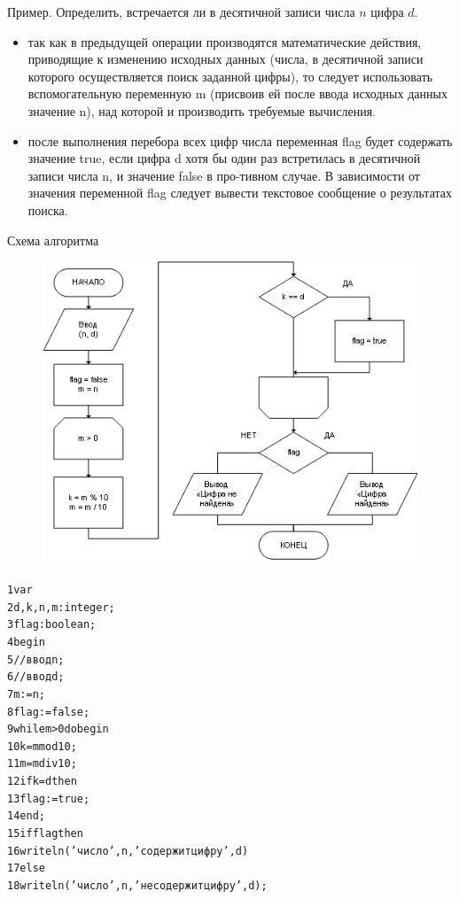 \documentclass{beamer}
\begin{document}
\begin{frame}{Пример.}
Определить, встречается ли в десятичной записи числа $n$ цифра $d$.
\begin{itemize}
\item так как в предыдущей операции производятся математические действия, приводящие к изменению исходных данных (числа, в десятичной записи которого осуществляется поиск заданной цифры), то следует использовать вспомогательную переменную m (присвоив ей после ввода исходных данных значение n), над которой и производить требуемые вычисления.
\item после выполнения перебора всех цифр числа переменная flag будет содержать значение true, если цифра d хотя бы один раз встретилась в десятичной записи числа n, и значение false в про-тивном случае. В зависимости от значения переменной flag следует вывести текстовое сообщение о результатах поиска.
\end{itemize}
\end{frame}

\begin{frame}{Схема алгоритма}
\begin{figure}[h]
\centering
\includegraphics[scale=0.7]{images/lec04-pic10.png}
\end{figure}
\end{frame}

\begin{frame}[fragile]
\begin{alltt}
1 var  
2   d, k, n, m: integer;
3   flag: boolean;
4 begin
5   //ввод n; 
6   //ввод d;
7   m := n;
8   flag := false;
9   while m > 0 do begin
10    k = m mod 10;
11    m = m div 10;
12    if k = d then 
13       flag := true;
14  end;
15  if flag then
16    writeln('число ', n, ' содержит цифру ', d)
17  else
18    writeln('число ', n, ' не содержит цифру ', d);
\end{alltt}
\end{frame}
\end{document}
